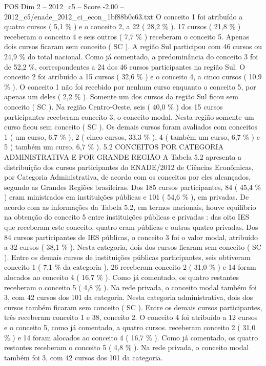 \begin{textsample}{POS Dim 2 – 2012\_c5 – Score -2.00 – 2012\_c5/enade\_2012\_ci\_econ\_1bf88b0c63.txt}
O conceito 1 foi atribuído a quatro cursos ( 5,1 \% ) e o conceito 2, a 22 ( 28,2 \% ). 17 cursos ( 21,8 \% ) receberam o conceito 4 e seis outros ( 7,7 \% ) receberam o conceito 5.
Apenas dois cursos ficaram sem conceito ( SC ).
A região Sul participou com 46 cursos ou 24,9 \% do total nacional.
Como já comentado, a predominância do conceito 3 foi de 52,2 \%, correspondentes a 24 dos 46 cursos participantes na região Sul.
O conceito 2 foi atribuído a 15 cursos ( 32,6 \% ) e o conceito 4, a cinco cursos ( 10,9 \% ).
O conceito 1 não foi recebido por nenhum curso enquanto o conceito 5, por apenas um deles ( 2,2 \% ).
Somente um dos cursos da região Sul ficou sem conceito ( SC ).
Na região Centro-Oeste, seis ( 40,0 \% ) dos 15 cursos participantes receberam conceito 3, o conceito modal.
Nesta região somente um curso ficou sem conceito ( SC ).
Os demais cursos foram avaliados com conceitos 1 ( um curso, 6,7 \% ), 2 ( cinco cursos, 33,3 \% ), 4 ( também um curso, 6,7 \% ) e 5 ( também um curso, 6,7 \% ). 5.2 CONCEITOS POR CATEGORIA ADMINISTRATIVA E POR GRANDE REGIÃO A Tabela 5.2 apresenta a distribuição dos cursos participantes do ENADE/2012 de Ciências Econômicas, por Categoria Administrativa, de acordo com os conceitos por eles alcançados, segundo as Grandes Regiões brasileiras.
Dos 185 cursos participantes, 84 ( 45,4 \% ) eram ministrados em instituições públicas e 101 ( 54,6 \% ), em privadas.
De acordo com as informações da Tabela 5.2, em termos nacionais, houve equilíbrio na obtenção do conceito 5 entre instituições públicas e privadas : das oito IES que receberam este conceito, quatro eram públicas e outras quatro privadas.
Dos 84 cursos participantes de IES públicas, o conceito 3 foi o valor modal, atribuído a 32 cursos ( 38,1 \% ).
Nesta categoria, dois dos cursos ficaram sem conceito ( SC ).
Entre os demais cursos de instituições públicas participantes, seis obtiveram conceito 1 ( 7,1 \% da categoria ), 26 receberam conceito 2 ( 31,0 \% ) e 14 foram alocados ao conceito 4 ( 16,7 \% ).
Como já comentado, os quatro restantes receberam o conceito 5 ( 4,8 \% ).
Na rede privada, o conceito modal também foi 3, com 42 cursos dos 101 da categoria.
Nesta categoria administrativa, dois dos cursos também ficaram sem conceito ( SC ).
Entre os demais cursos participantes, três receberam conceito 1 e 38, conceito 2.
O conceito 4 foi atribuído a 12 cursos e o conceito 5, como já comentado, a quatro cursos. receberam conceito 2 ( 31,0 \% ) e 14 foram alocados ao conceito 4 ( 16,7 \% ).
Como já comentado, os quatro restantes receberam o conceito 5 ( 4,8 \% ).
Na rede privada, o conceito modal também foi 3, com 42 cursos dos 101 da categoria.

\end{textsample}
